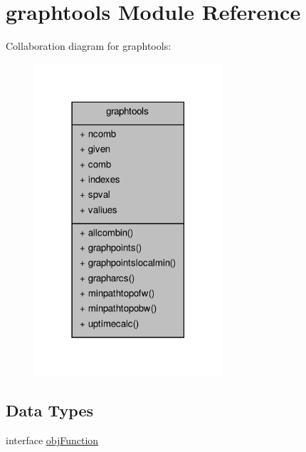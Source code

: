 \hypertarget{classgraphtools}{\section{graphtools Module Reference}
\label{classgraphtools}
}


Collaboration diagram for graphtools\-:
\nopagebreak
\begin{figure}[H]
\begin{center}
\leavevmode
\includegraphics[width=198pt]{classgraphtools__coll__graph}
\end{center}
\end{figure}
\subsection*{Data Types}
\begin{DoxyCompactItemize}
\item 
interface \hyperlink{interfacegraphtools_1_1obj_function}{obj\-Function}
\end{DoxyCompactItemize}
